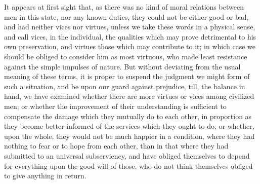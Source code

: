 \documentclass[11pt,twocolumn]{ltugboat}
\begin{document}
It appears at first sight that, as there was no kind of moral
relations between men in this state, nor any known duties, they could
not be either good or bad, and had neither vices nor virtues, unless
we take these words in a physical sense, and call vices, in the
individual, the qualities which may prove detrimental to his own
preservation, and virtues those which may contribute to it; in which
case we should be obliged to consider him as most virtuous, who made
least resistance against the simple impulses of nature. But without
deviating from the usual meaning of these terms, it is proper to
suspend the judgment we might form of such a situation, and be upon
our guard against prejudice, till, the balance in hand, we have
examined whether there are more virtues or vices among civilized men;
or whether the improvement of their understanding is sufficient to
compensate the damage which they mutually do to each other, in
proportion as they become better informed of the services which they
ought to do; or whether, upon the whole, they would not be much
happier in a condition, where they had nothing to fear or to hope from
each other, than in that where they had submitted to an universal
subserviency, and have obliged themselves to depend for everything
upon the good will of those, who do not think themselves obliged to
give anything in return.
\end{document}
